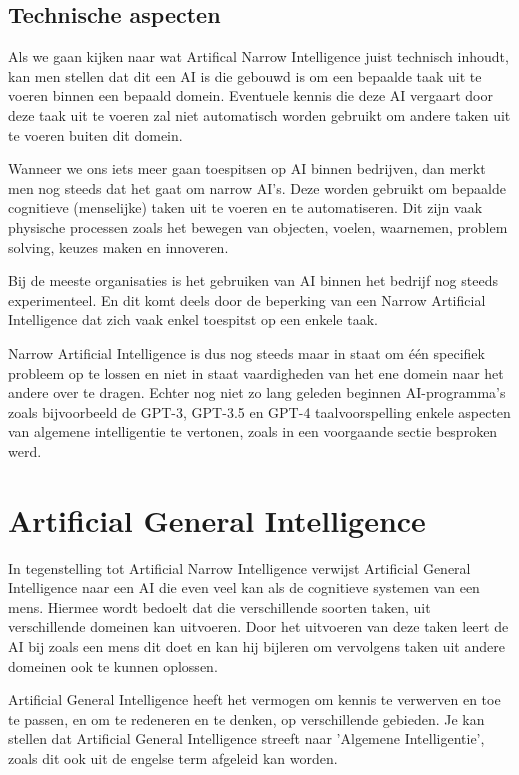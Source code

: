 \subsection{Technische aspecten}

Als we gaan kijken naar wat Artifical Narrow Intelligence juist technisch inhoudt, kan men stellen dat dit een AI is die gebouwd is om een bepaalde taak uit te voeren binnen een bepaald domein. Eventuele kennis die deze AI vergaart door deze taak uit te voeren zal niet automatisch worden gebruikt om andere taken uit te voeren buiten dit domein. 

Wanneer we ons iets meer gaan toespitsen op AI binnen bedrijven, dan merkt men nog steeds dat het gaat om narrow AI’s. Deze worden gebruikt om bepaalde cognitieve (menselijke) taken uit te voeren en te automatiseren. Dit zijn vaak physische processen zoals het bewegen van objecten, voelen, waarnemen, problem solving, keuzes maken en innoveren. 

Bij de meeste organisaties is het gebruiken van AI binnen het bedrijf nog steeds experimenteel. En dit komt deels door de beperking van een Narrow Artificial Intelligence dat zich vaak enkel toespitst op een enkele taak.

Narrow Artificial Intelligence is dus nog steeds maar in staat om één specifiek probleem op te lossen en niet in staat vaardigheden van het ene domein naar het andere over te dragen. Echter nog niet zo lang geleden beginnen AI-programma’s zoals bijvoorbeeld de GPT-3, GPT-3.5 en GPT-4 taalvoorspelling enkele aspecten van algemene intelligentie te vertonen, zoals in een voorgaande sectie besproken werd.

\autocite{benbya2020artificial}

\section{Artificial General Intelligence}

In tegenstelling tot Artificial Narrow Intelligence verwijst Artificial General Intelligence naar een AI die even veel kan als de cognitieve systemen van een mens. Hiermee wordt bedoelt dat die verschillende soorten taken, uit verschillende domeinen kan uitvoeren. Door het uitvoeren van deze taken leert de AI bij zoals een mens dit doet en kan hij bijleren om vervolgens taken uit andere domeinen ook te kunnen oplossen. 

Artificial General Intelligence heeft het vermogen om kennis te verwerven en toe te passen, en om te redeneren en te denken, op verschillende gebieden. Je kan stellen dat Artificial General Intelligence streeft naar 'Algemene Intelligentie', zoals dit ook uit de engelse term afgeleid kan worden. 



